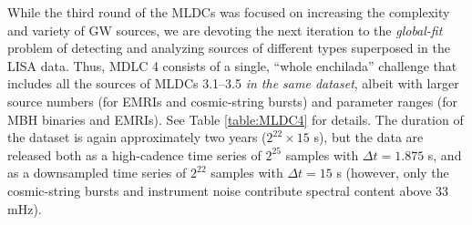 \documentclass{iopart}
\begin{document}
While the third round of the MLDCs was focused on increasing the complexity and variety of GW sources, we are devoting the next iteration to the \emph{global-fit} problem of detecting and analyzing sources of different types superposed in the LISA data. Thus, MDLC 4 consists of a single, ``whole enchilada'' challenge that includes all the sources of MLDCs 3.1--3.5 \emph{in the same dataset}, albeit with larger source numbers (for EMRIs and cosmic-string bursts) and parameter ranges (for MBH binaries and EMRIs). See Table \ref{table:MLDC4} for details. The duration of the dataset is again approximately two years ($2^{22} \times 15$ s), but the data are released both as a high-cadence time series of $2^{25}$ samples with $\Delta t = 1.875$ s, and as a downsampled time series of $2^{22}$ samples with $\Delta t = 15$ s (however, only the cosmic-string bursts and instrument noise contribute spectral content above 33 mHz).
%
\end{document}
